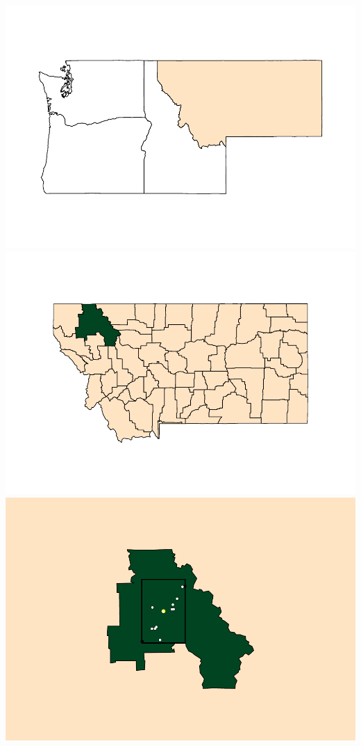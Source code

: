 \documentclass[
]{article}
\begin{document}
\includegraphics{graphics/chunk-distances-compute-cfalls-1.pdf}
\includegraphics{graphics/chunk-distances-compute-cfalls-2.pdf}
\includegraphics{graphics/chunk-distances-compute-cfalls-3.pdf}
\end{document}

